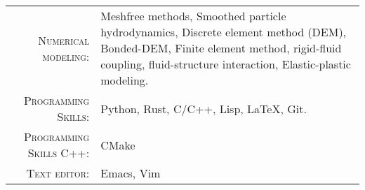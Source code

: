 %
%



\renewcommand{\arraystretch}{1.1}

    \begin{tabular}{>{}r>{}p{13cm}}
      \textsc{Numerical modeling:} & Meshfree methods, Smoothed particle hydrodynamics,
                                     Discrete element method (DEM), Bonded-DEM,
                                     Finite element method, rigid-fluid coupling,
                                     fluid-structure interaction,
                                     Elastic-plastic modeling.\\

      \textsc{Programming Skills:}    &  Python, Rust, C/C++, Lisp, \LaTeX, Git.\\

      \textsc{Programming Skills C++:}  &  CMake\\

      \textsc{Text editor:}    &  Emacs, Vim
    \end{tabular}
